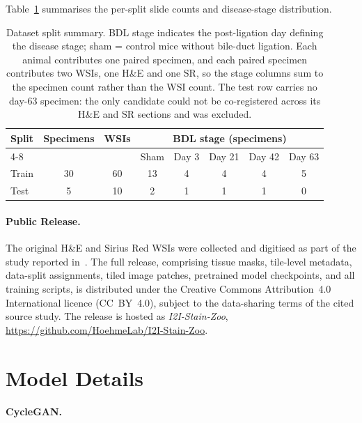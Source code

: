 Table~\ref{tab:supp-split_stats} summarises the per-split slide counts and disease-stage
distribution.

\begin{table}[h]
\centering
\caption{Dataset split summary. BDL stage indicates the post-ligation day defining
the disease stage; sham = control mice without bile-duct ligation. Each animal
contributes one paired specimen, and each paired specimen contributes two WSIs,
one H\&E and one SR, so the stage columns sum to the specimen count rather than
the WSI count. The test row carries no day-63 specimen: the only candidate could not
be co-registered across its H\&E and SR sections and was excluded.}
\label{tab:supp-split_stats}
\begin{tabular}{lccccccc}
\toprule
\textbf{Split} & \textbf{Specimens} & \textbf{WSIs} &
\multicolumn{5}{c}{\textbf{BDL stage (specimens)}} \\
\cmidrule(lr){4-8}
& & & Sham & Day 3 & Day 21 & Day 42 & Day 63 \\
\midrule
Train & 30 & 60 & 13 & 4 & 4 & 4 & 5 \\
Test  &  5 & 10 & 2 & 1 & 1 & 1 & 0 \\
\bottomrule
\end{tabular}
\end{table}

\paragraph{Public Release.}
\label{sec:supp-public_release}

The original H\&E and Sirius Red WSIs were collected and digitised as part of
the study reported in~\cite{ghallab2025asbt}.
The full release, comprising tissue masks, tile-level metadata, data-split
assignments, tiled image patches, pretrained model checkpoints, and all training
scripts, is distributed under the Creative Commons Attribution~4.0 International
licence (CC~BY~4.0), subject to the data-sharing terms of the cited source study.
The release is hosted as \textit{I2I-Stain-Zoo},
\url{https://github.com/HoehmeLab/I2I-Stain-Zoo}.


\section{Model Details}
\label{sec:supp-models}

\paragraph{CycleGAN.}
\label{sec:supp-cyclegan}

